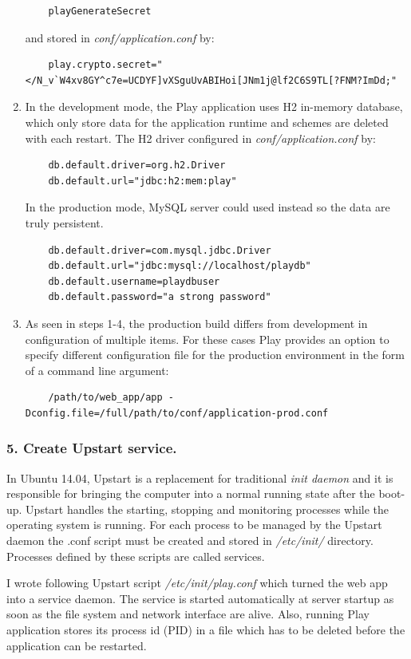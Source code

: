 \documentclass[12pt,twoside,a4paper]{report}
\begin{document}
\begin{enumerate}
\begin{lstlisting}
	playGenerateSecret
\end{lstlisting}
and stored in \emph{conf/application.conf} by:
\begin{lstlisting} 
	play.crypto.secret="</N_v`W4xv8GY^c7e=UCDYF]vXSguUvABIHoi[JNm1j@lf2C6S9TL[?FNM?ImDd;"
\end{lstlisting}
\item In the development mode, the Play application uses H2 in-memory database, which only store data for the application runtime and schemes are deleted with each restart. The H2 driver configured in \emph{conf/application.conf} by:
\begin{lstlisting} 
	db.default.driver=org.h2.Driver
	db.default.url="jdbc:h2:mem:play"
\end{lstlisting}
In the production mode, MySQL server could used instead so the data are truly persistent.
\begin{lstlisting}
	db.default.driver=com.mysql.jdbc.Driver
	db.default.url="jdbc:mysql://localhost/playdb"
	db.default.username=playdbuser
	db.default.password="a strong password"
\end{lstlisting}
\item As seen in steps 1-4, the production build differs from development in configuration of multiple items. For these cases Play provides an option to specify different configuration file for the production environment in the form of a command line argument:
\begin{lstlisting} 
	/path/to/web_app/app -Dconfig.file=/full/path/to/conf/application-prod.conf
\end{lstlisting}
\end{enumerate}

\subsubsection{5. Create Upstart service.}
In Ubuntu 14.04, Upstart is a replacement for traditional \emph{init daemon} and it is responsible for bringing the computer into a normal running state after the boot-up. Upstart handles the starting, stopping and monitoring processes while the operating system is running. For each process to be managed by the Upstart daemon the .conf script must be created and stored in \emph{/etc/init/} directory. Processes defined by these scripts are called services.

I wrote following Upstart script \emph{/etc/init/play.conf} which turned the web app into a service daemon. The service is  started automatically at server startup as soon as the file system and network interface are alive. Also, running Play application stores its process id (PID) in a file which has to be deleted before the application can be restarted.
\end{document}
